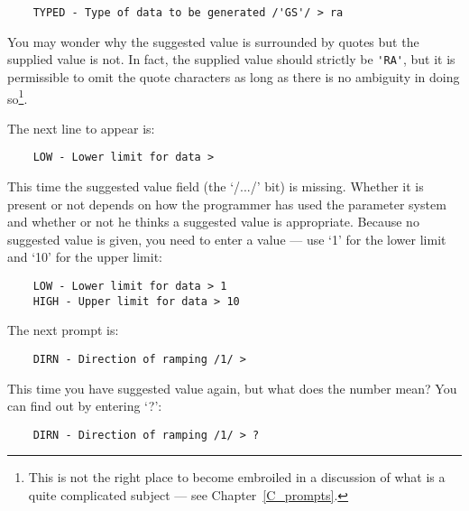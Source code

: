 \begin{small}
\begin{verbatim}
    TYPED - Type of data to be generated /'GS'/ > ra
\end{verbatim}
\end{small}

You may wonder why the suggested value is surrounded by quotes but the supplied
value is not.
In fact, the supplied value should strictly be \verb+'RA'+, but it is
permissible to omit the quote characters as long as there is no ambiguity in
doing so\footnote{This is not the right place to become embroiled in a
discussion of what is a quite complicated subject --- see
Chapter~\ref{C_prompts}.}.

The next line to appear is:

\begin{small}
\begin{verbatim}
    LOW - Lower limit for data >
\end{verbatim}
\end{small}

This time the suggested value field (the `/.../' bit) is missing.
Whether it is present or not depends on how the programmer has used the
parameter system and whether or not he thinks a suggested value is appropriate.
Because no suggested value is given, you need to enter a value --- use
`1' for the lower limit and `10' for the upper limit:

\begin{small}
\begin{verbatim}
    LOW - Lower limit for data > 1
    HIGH - Upper limit for data > 10
\end{verbatim}
\end{small}

The next prompt is:

\begin{small}
\begin{verbatim}
    DIRN - Direction of ramping /1/ >
\end{verbatim}
\end{small}

This time you have suggested value again, but what does the number mean?
You can find out by entering `?':

\begin{small}
\begin{verbatim}
    DIRN - Direction of ramping /1/ > ?
\end{verbatim}
\end{small}

